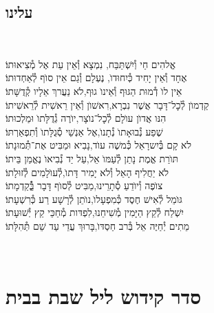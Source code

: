 \documentclass[twoside, openany, parskip=half, 11pt]{book}
\begin{document}
\section*{ עלינו }
\aleinu

\ledavid
\\
\mournerskaddish




אֱלהִים חַי וְ֯יִשְׁתַּבַּח, \hfill נִמְצָא וְ֯אֵין עֵת אֶל מְ֯צִיאוּתוֹ׃ \\
אֶחָד וְ֯אֵין יָחִיד כְּ֯יִחוּדוׂ, \hfill נֶעְלָם וְ֯גַם אֵין סוׂף לְ֯אַחְדוּתוֹ׃ \\
אֵין לוׂ דְ֯מוּת הַגּוּף וְ֯אֵינוׂ גוּף,\hfill לׂא נַעֲרךְ אֵלָיו קְ֯דֻשָּׁתוֹ׃ \\
קַדְמוׂן לְ֯כׇל־דָּבָר אֲשֶׁר נִבְרָא,\hfill רִאשׁוׂן וְ֯אֵין רֵאשִׁית לְ֯רֵאשִׁיתוֹ׃ \\
הִנּו אֲדוׂן עוׂלָם לְ֯כׇל־נוׂצָר,\hfill יוׂרֶה גְ֯דֻלָּתוׂ וּמַלְכוּתוֹ׃ \\
שֶׁפַע נְ֯בוּאָתוׂ נְ֯תָנוׂ,\hfill אֶל אַנְשֵׁי סְ֯גֻלָּתוׂ וְ֯תִפְאַרְתּוֹ׃ \\
לׂא קָם בְּ֯יִשרָאֵל כְּ֯משֶׁה עוׂד,\hfill נָבִיא וּמַבִּיט אֶת־תְּ֯מוּנָתוֹ׃ \\
תּוׂרַת אֱמֶת נָתַן לְ֯עַמּוׂ אֵל,\hfill עַל יַד נְ֯בִיאוׂ נֶאֱמַן בֵּיתוֹ׃ \\
לׂא יַחֲלִיף הָאֵל וְ֯לׂא יָמִיר דָּתוׂ,\hfill לְ֯עוׂלָמִים לְ֯זוּלָתוֹ׃ \\
צוׂפֶה וְ֯יוׂדֵעַ סְ֯תָרֵינוּ,\hfill מַבִּיט לְ֯סוׂף דָּבָר בְְַּ֯֯קַדְמָתוֹ׃ \\
גּוׂמֵל לְ֯אִישׁ חֶסֶד כְּ֯מִפְעָלוׂ,\hfill נוׂתֵן לְ֯רָשָׁע רַע כְּ֯רִשְׁעָתוֹ׃ \\
יִשְׁלַח לְ֯קֵץ הַיָּמִין מְ֯שִׁיחֵנוּ,\hfill לִפְדּות מְ֯חַכֵּי קֵץ יְ֯שׁוּעָתוֹ׃ \\
מֵתִים יְ֯חַיֶּה אֵל בְּ֯רב חַסְדּוׂ,\hfill בָּרוּךְ עֲדֵי עַד שֵׁם תְּ֯הִלָּתוֹ׃\\

\vfill

\quad{}\quad{}\\

\chapter[קידוש ליל שבת]{ סדר קידוש ליל שבת בבית }
\end{document}
